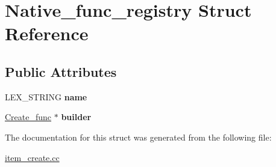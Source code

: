 \hypertarget{structNative__func__registry}{}\section{Native\+\_\+func\+\_\+registry Struct Reference}
\label{structNative__func__registry}
\subsection*{Public Attributes}
\begin{DoxyCompactItemize}
\item 
\mbox{\label{structNative__func__registry_afe8739a705495c645b8e527cb075b6be}} 
L\+E\+X\+\_\+\+S\+T\+R\+I\+NG {\bfseries name}
\item 
\mbox{\label{structNative__func__registry_a828cdabd5d7c390284eaa6905abe0543}} 
\mbox{\hyperlink{classCreate__func}{Create\+\_\+func}} $\ast$ {\bfseries builder}
\end{DoxyCompactItemize}


The documentation for this struct was generated from the following file\+:\begin{DoxyCompactItemize}
\item 
\mbox{\hyperlink{item__create_8cc}{item\+\_\+create.\+cc}}\end{DoxyCompactItemize}
